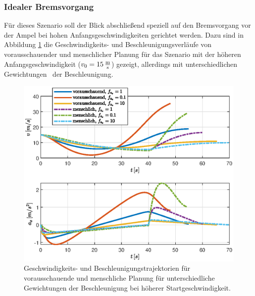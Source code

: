\subsubsection{Idealer Bremsvorgang}\label{subsubsec:Bremsvorgang}
Für dieses Szenario soll der Blick abschließend speziell auf den Bremsvorgang vor der Ampel bei hohen Anfangsgeschwindigkeiten gerichtet werden. Dazu sind in Abbildung \ref{fig:va_fa_variabel} die Geschwindigkeits- und Beschleunigungsverläufe von vorausschauender und menschlicher Planung für das Szenario mit der höheren Anfangsgeschwindigkeit ($v_0 = 15\,\mathrm{\frac{\mathrm{m}}{\mathrm{s}}}$) gezeigt, allerdings mit unterschiedlichen Gewichtungen \fax~der Beschleunigung. 
\begin{figure}[h] 
	\centering
	\includegraphics[width=0.9\linewidth]{./Bilder/Ergebnisse/Geradeausfahrt/Ampel/v_5_v_15/va_fa_variabel.eps}
	\caption{Geschwindigkeits- und Beschleunigungstrajektorien für vorausschauende und menschliche Planung für unterschiedliche Gewichtungen der Beschleunigung bei höherer Startgeschwindigkeit.}
	\label{fig:va_fa_variabel}
\end{figure} 
